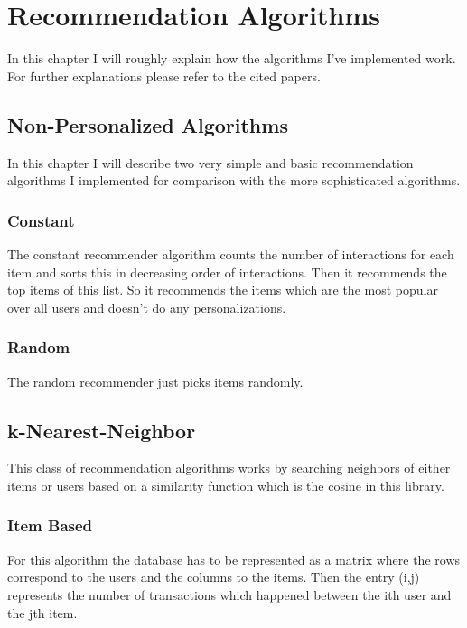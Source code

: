 
\chapter{Recommendation Algorithms}
In this chapter I will roughly explain how the algorithms I've implemented
work. For further explanations please refer to the cited papers.


\section{Non-Personalized Algorithms}

In this chapter I will describe two very simple and basic recommendation
algorithms I implemented for comparison with the more sophisticated
algorithms.


\subsection{Constant}

The constant recommender algorithm counts the number of interactions
for each item and sorts this in decreasing order of interactions.
Then it recommends the top items of this list. So it recommends the
items which are the most popular over all users and doesn't do any
personalizations.


\subsection{Random}

The random recommender just picks items randomly.


\section{k-Nearest-Neighbor}

This class of recommendation algorithms works by searching neighbors
of either items or users based on a similarity function which is the
cosine in this library.


\subsection{Item Based}

For this algorithm the database has to be represented as a matrix
where the rows correspond to the users and the columns to the items.
Then the entry (i,j) represents the number of transactions which happened
between the ith user and the jth item. 

